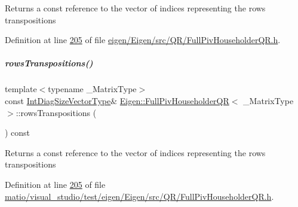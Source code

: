 \begin{DoxyReturn}{Returns}
a const reference to the vector of indices representing the rows transpositions 
\end{DoxyReturn}


Definition at line \hyperlink{eigen_2_eigen_2src_2_q_r_2_full_piv_householder_q_r_8h_source_l00205}{205} of file \hyperlink{eigen_2_eigen_2src_2_q_r_2_full_piv_householder_q_r_8h_source}{eigen/\+Eigen/src/\+Q\+R/\+Full\+Piv\+Householder\+Q\+R.\+h}.

\mbox{\label{group___q_r___module_abebbfc0ca6e3dd285a0ad0c907abb093}} 
\subparagraph{\texorpdfstring{rows\+Transpositions()}{rowsTranspositions()}\hspace{0.1cm}{\footnotesize\ttfamily [2/2]}}
{\footnotesize\ttfamily template$<$typename \+\_\+\+Matrix\+Type$>$ \\
const \hyperlink{group___core___module}{Int\+Diag\+Size\+Vector\+Type}\& \hyperlink{group___q_r___module_class_eigen_1_1_full_piv_householder_q_r}{Eigen\+::\+Full\+Piv\+Householder\+QR}$<$ \+\_\+\+Matrix\+Type $>$\+::rows\+Transpositions (\begin{DoxyParamCaption}{ }\end{DoxyParamCaption}) const\hspace{0.3cm}{\ttfamily [inline]}}

\begin{DoxyReturn}{Returns}
a const reference to the vector of indices representing the rows transpositions 
\end{DoxyReturn}


Definition at line \hyperlink{matio_2visual__studio_2test_2eigen_2_eigen_2src_2_q_r_2_full_piv_householder_q_r_8h_source_l00205}{205} of file \hyperlink{matio_2visual__studio_2test_2eigen_2_eigen_2src_2_q_r_2_full_piv_householder_q_r_8h_source}{matio/visual\+\_\+studio/test/eigen/\+Eigen/src/\+Q\+R/\+Full\+Piv\+Householder\+Q\+R.\+h}.

